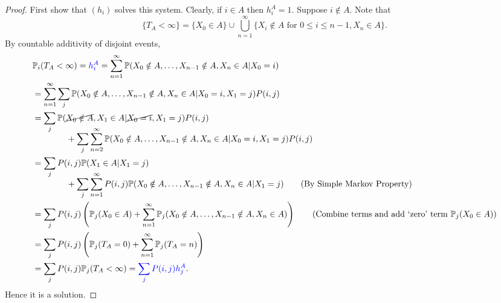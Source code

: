 \documentclass[a4paper]{article}
\begin{document}
\begin{proof}
	First show that $(h_i)$ solves this system. Clearly, if $i\in A$ then $ h_i^A=1 $. Suppose $i\notin A$. Note that 
    \[
        \{T_A<\infty\} = \{X_0\in A\} \cup \bigcup_{n=1}^{\infty}\{X_i\notin A \text{ for }0\le i\le n-1, X_n\in A\}.
    \]
    By countable additivity of disjoint events,
    \begin{align*}
        &\mathbb{P}_i(T_A< \infty)={\color{blue}h_i^A} =\sum_{n=1}^{\infty}\mathbb{P}(X_0\notin A,\dots,X_{n-1}\notin A, X_n\in A|X_0=i)\\ 
            &= \sum_{n=1}^{\infty} \sum_{j} \mathbb{P}(X_0\notin A,\dots,X_{n-1}\notin A, X_n\in A|X_0=i,X_1=j)P(i,j)\\ 
            &=\sum_j \mathbb{P}(\cancel{X_0\notin A}, X_1\in A|\cancel{X_0=i},X_1=j)P(i,j)\\[-1em]
            &\hspace{4em}+\sum_j \sum_{n=2}^{\infty}\mathbb{P}(X_0\notin A,\dots,X_{n-1}\notin A, X_n\in A|X_0=i,X_1=j)P(i,j)\\ 
            &=\sum_j P(i,j)\mathbb{P}(X_1\in A|X_1=j)\\[-1em]
            &\hspace{4em}+\sum_j \sum_{n=1}^{\infty}P(i,j)\mathbb{P}(X_0\notin A,\dots,X_{n-1}\notin A, X_n\in A|X_1=j)\tag{By Simple Markov Property} \\
            &= \sum_j P(i,j) \left( \mathbb{P}_j(X_0\in A)+\sum_{n=1}^{\infty} \mathbb{P}_j(X_0\notin A,\dots,X_{n-1}\notin A, X_n\in A)\right)\tag{Combine terms and add `zero' term $\mathbb{P}_j(X_0\in A)$}\\ 
            &= \sum_j P(i,j) \left( \mathbb{P}_j(T_A=0)+ \sum_{n=1}^{\infty}\mathbb{P}_j(T_A=n) \right)\\ 
            &= \sum_j P(i,j) \bbP_j(T_A< \infty ) = {\color{blue}\sum_j P(i,j)h_j^A}.
    \end{align*}
    Hence it is a solution.


\end{proof}
\end{document}

